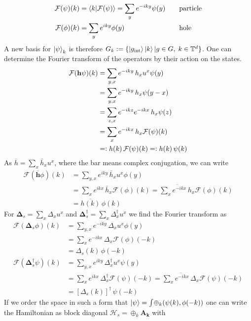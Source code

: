 \begin{alignat*}{2}
    \mathcal{F}(\psi)(k)&=\braket{k|\mathcal{F}(\psi)}=\sum_y e^{-iky}\psi(y)\quad&&\text{particle}\\
    \mathcal{F}(\phi)(k)&=\sum_y e^{iky}\phi(y)\quad&&\text{hole}
\end{alignat*}
A new basis for $\ket{\psi}_k$ is therefore $G_k:=\{ \ket{g_\text{int}}\ket{k}|g\in G,\;k\in\mathbb{T}^d \}$. One can determine the Fourier transform of the operators by their action on the states.
\begin{align*}
    \mathcal{F}(\mathbf{h}\psi)(k)&=\sum_{y,x}e^{-iky}\,h_x u^x \psi(y)\\
    &=\sum_{y,x}e^{-iky}\,h_x \psi(y-x)\\
    &=\sum_{z,x}e^{-ikz}e^{-ikx}\,h_x \psi(z)\\
    &=\sum_{x}e^{-ikx}\,h_x \mathcal{F}(\psi)(k)\\
    &=\vcentcolon {h}(k)\,\mathcal{F}(\psi)(k)=\vcentcolon {h}(k)\,\psi(k)
\end{align*}
As $\overline{{h}}=\sum_x\bar{h}_x u^x$, where the bar means complex conjugation, we can write
\begin{align*}
    \mathcal{F}(\overline{\mathbf{h}}\phi)(k)&=\sum_{y,x}e^{iky}\,\bar{h}_x u^x \phi(y)\\
    &=\sum_{x}e^{ikx}\,\bar{h}_x \mathcal{F}(\phi)(k)=\overline{\sum_{x}e^{-ikx}\,h_x} \mathcal{F}(\phi)(k)\\
    &= \overline{{h}(k)}\,\phi(k)
\end{align*}
For $\mathbf{\Delta}_s=\sum_x\Delta_x u^x$ and $\mathbf{\Delta}_s^\dagger=\sum_x\Delta_x^\dagger u^x$ we find the Fourier transform as
\begin{align*}
     \mathcal{F}(\mathbf{\Delta}_s\phi)(k)&=\sum_{y,x}e^{-iky}\,\Delta_x u^x \phi(y)\\
    &=\sum_{x}e^{-ikx}\,\Delta_x \mathcal{F}(\phi)(-k)\\
    &= {\Delta}_s(k)\,\phi(-k)\\
    \mathcal{F}(\mathbf{\Delta}_s^\dagger\psi)(k)&=\sum_{y,x}e^{iky}\,\Delta_x^\dagger u^x \psi(y)\\
    &=\sum_{x}e^{ikx}\,\Delta_x^\dagger \mathcal{F}(\psi)(-k)=\overline{\sum_{x}e^{-ikx}\,\Delta_x} \mathcal{F}(\psi)(-k)\\
    &= [{\Delta}_s(k)]^\dagger\,\psi(-k)
\end{align*}
If we order the space in such a form that $\ket{\psi}=\int_{\mathbb{}}\oplus_k (\psi(k),\phi(-k))$ one can write the Hamiltonian as block diagonal $\mathcal{H}_s=\oplus_k \mathbf{A_k}$ with
